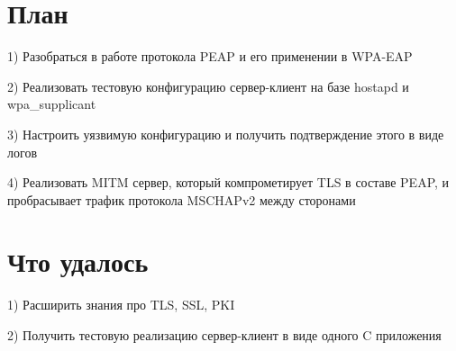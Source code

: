 \documentclass[unicode]{beamer}
\begin{document}
\section{План}
\begin{frame}
    1) Разобраться в работе протокола PEAP и его применении в WPA-EAP

    2) Реализовать тестовую конфигурацию сервер-клиент
      на базе hostapd и wpa\_supplicant

    3) Настроить уязвимую конфигурацию и получить подтверждение этого
      в виде логов

    4) Реализовать MITM сервер, который компрометирует TLS в составе PEAP,
      и пробрасывает трафик протокола MSCHAPv2 между сторонами
\end{frame}

\section{Что удалось}
\begin{frame}
  1) Расширить знания про TLS, SSL, PKI

  2) Получить тестовую реализацию сервер-клиент в виде одного
    C приложения
\end{frame}
\end{document}
